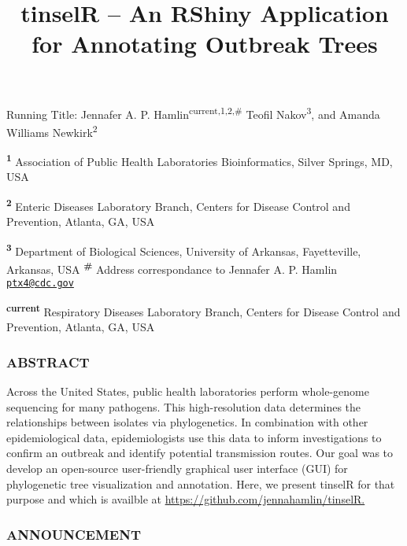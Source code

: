 \documentclass[
]{article}
\title{tinselR -- An RShiny Application for Annotating Outbreak Trees}
\author{}
\date{\vspace{-2.5em}}
\begin{document}
\maketitle

Running Title: \newline \newline Jennafer A. P.
Hamlin\textsuperscript{current,1,2,\#} Teofil Nakov\textsuperscript{3},
and Amanda Williams Newkirk\textsuperscript{2}\\
\newline

\textsuperscript{\textbf{1}} Association of Public Health Laboratories
Bioinformatics, Silver Springs, MD, USA

\textsuperscript{\textbf{2}} Enteric Diseases Laboratory Branch, Centers
for Disease Control and Prevention, Atlanta, GA, USA

\textsuperscript{\textbf{3}} Department of Biological Sciences,
University of Arkansas, Fayetteville, Arkansas, USA \newline \newline
\textsuperscript{\textbf{\#}} Address correspondance to Jennafer A. P.
Hamlin \href{mailto:ptx4@cdc.gov}{\nolinkurl{ptx4@cdc.gov}}

\textsuperscript{\textbf{current}} Respiratory Diseases Laboratory
Branch, Centers for Disease Control and Prevention, Atlanta, GA, USA
\newline

\hypertarget{abstract}{%
\subsubsection{ABSTRACT}\label{abstract}}

Across the United States, public health laboratories perform
whole-genome sequencing for many pathogens. This high-resolution data
determines the relationships between isolates via phylogenetics. In
combination with other epidemiological data, epidemiologists use this
data to inform investigations to confirm an outbreak and identify
potential transmission routes. Our goal was to develop an open-source
user-friendly graphical user interface (GUI) for phylogenetic tree
visualization and annotation. Here, we present tinselR for that purpose
and which is availble at
\href{https://github.com/jennahamlin/tinselR}{https://github.com/jennahamlin/tinselR.}

\hypertarget{announcement}{%
\subsubsection{ANNOUNCEMENT}\label{announcement}}
\end{document}
